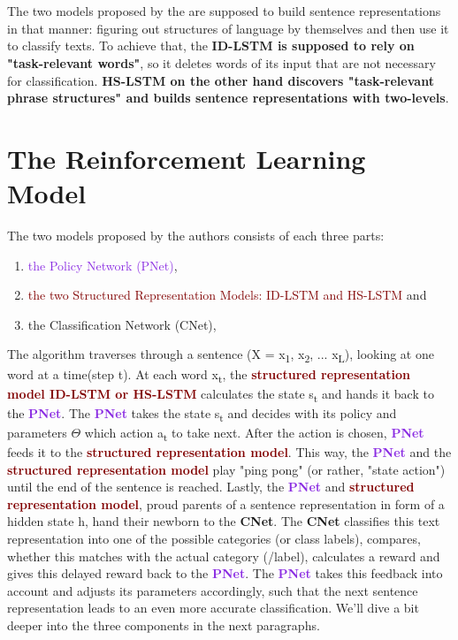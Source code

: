 \documentclass{article}
\begin{document}
\\\\ The two models proposed by the \cite{zhang2018} are supposed to build sentence representations in that manner: figuring out structures of language by themselves and then use it to classify texts. To achieve that, the \textbf{ID-LSTM is supposed to rely on "task-relevant words"}, so it deletes words of its input that are not necessary for classification. \textbf{HS-LSTM on the other hand discovers "task-relevant phrase structures" and builds sentence representations with two-levels}.
\newpage

\section{The Reinforcement Learning Model}\label{sec:rlmodel}
The two models proposed by the authors consists of each three parts:
\begin{enumerate}
    \item \textcolor{BlueViolet}{the Policy Network (PNet)},
    \item \textcolor{Maroon}{the two Structured Representation Models: ID-LSTM and HS-LSTM} and
    \item \textcolor{yelloww}{the Classification Network (CNet)},
\end{enumerate}

The algorithm traverses through a sentence (X = x\textsubscript{1}, x\textsubscript{2}, ... x\textsubscript{L}), looking at one word at a time(step t). At each word x\textsubscript{t}, the \textcolor{Maroon}{\textbf{structured representation model ID-LSTM or HS-LSTM}} calculates the state s\textsubscript{t} and hands it back to the \textcolor{BlueViolet}{\textbf{PNet}}. The \textcolor{BlueViolet}{\textbf{PNet}} takes the state s\textsubscript{t} and decides with its policy and parameters $\Theta$ which action a\textsubscript{t} to take next. After the action is chosen, \textcolor{BlueViolet}{\textbf{PNet}} feeds it to the \textcolor{Maroon}{\textbf{structured representation model}}. This way, the \textcolor{BlueViolet}{\textbf{PNet}} and the \textcolor{Maroon}{\textbf{structured representation model}} play "ping pong" (or rather, "state action") until the end of the sentence is reached. Lastly, the \textcolor{BlueViolet}{\textbf{PNet}} and \textcolor{Maroon}{\textbf{structured representation model}}, proud parents of a sentence representation in form of a hidden state h, hand their newborn to the \textcolor{yelloww}{\textbf{CNet}}. The \textcolor{yelloww}{\textbf{CNet}} classifies this text representation into one of the possible categories (or class labels), compares, whether this matches with the actual category (/label), calculates a reward and gives this delayed reward back to the \textcolor{BlueViolet}{\textbf{PNet}}. The \textcolor{BlueViolet}{\textbf{PNet}} takes this feedback into account and adjusts its parameters accordingly, such that the next sentence representation leads to an even more accurate classification. We'll dive a bit deeper into the three components in the next paragraphs.
\end{document}
